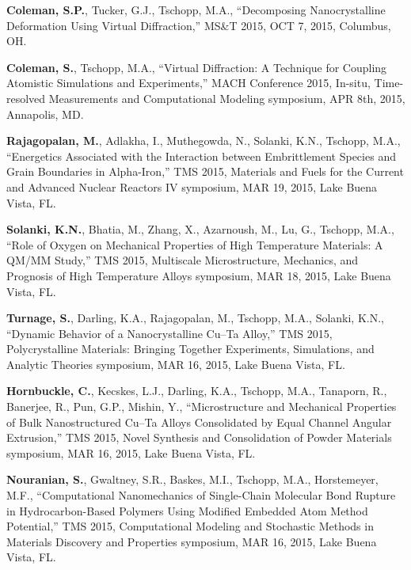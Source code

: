 \begin{cvlist}
\item
\textbf{Coleman, S.P.}, Tucker, G.J., Tschopp, M.A., ``Decomposing Nanocrystalline Deformation Using Virtual Diffraction,'' MS\&T 2015, OCT 7, 2015, Columbus, OH.

\item
{\textbf{Coleman, S.}}, Tschopp, M.A.,  ``Virtual Diffraction: A Technique for Coupling Atomistic Simulations and Experiments,'' MACH Conference 2015, In-situ, Time-resolved Measurements and Computational Modeling symposium, APR 8th, 2015, Annapolis, MD.

\item
{\textbf{Rajagopalan, M.}}, Adlakha, I., Muthegowda, N., Solanki, K.N., Tschopp, M.A., ``Energetics Associated with the Interaction between Embrittlement Species and Grain Boundaries in Alpha-Iron,'' TMS 2015, Materials and Fuels for the Current and Advanced Nuclear Reactors IV symposium, MAR 19, 2015, Lake Buena Vista, FL.

\item
\textbf{Solanki, K.N.}, Bhatia, M., Zhang, X., Azarnoush, M., Lu, G., Tschopp, M.A., ``Role of Oxygen on Mechanical Properties of High Temperature Materials: A QM/MM Study,'' TMS 2015, Multiscale Microstructure, Mechanics, and Prognosis of High Temperature Alloys symposium, MAR 18, 2015, Lake Buena Vista, FL.

\item
\textbf{Turnage, S.}, Darling, K.A., Rajagopalan, M., Tschopp, M.A., Solanki, K.N., ``Dynamic Behavior of a Nanocrystalline Cu--Ta Alloy,'' TMS 2015, Polycrystalline Materials: Bringing Together Experiments, Simulations, and Analytic Theories symposium, MAR 16, 2015, Lake Buena Vista, FL.

\item
\textbf{Hornbuckle, C.}, Kecskes, L.J., Darling, K.A., Tschopp, M.A., Tanaporn, R., Banerjee, R., Pun, G.P., Mishin, Y., ``Microstructure and Mechanical Properties of Bulk Nanostructured Cu--Ta Alloys Consolidated by Equal Channel Angular Extrusion,'' TMS 2015, Novel Synthesis and Consolidation of Powder Materials symposium, MAR 16, 2015, Lake Buena Vista, FL.

\item
\textbf{Nouranian, S.}, Gwaltney, S.R., Baskes, M.I., Tschopp, M.A., Horstemeyer, M.F., ``Computational Nanomechanics of Single-Chain Molecular Bond Rupture in Hydrocarbon-Based Polymers Using Modified Embedded Atom Method Potential,''  TMS 2015, Computational Modeling and Stochastic Methods in Materials Discovery and Properties symposium, MAR 16, 2015, Lake Buena Vista, FL.


\end{cvlist}
